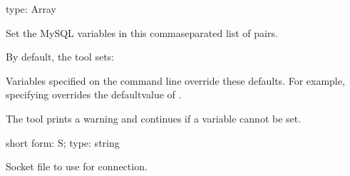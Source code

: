 \documentclass[letterpaper,10pt,english]{sphinxmanual}
\begin{document}
\begin{fulllineitems}
\label{\detokenize{mariadb-config-diff:cmdoption-mariadb-config-diff-set-vars}}
type: Array

Set the MySQL variables in this comma\sphinxhyphen{}separated list of  pairs.

By default, the tool sets:

\begin{sphinxVerbatim}[commandchars=\\\{\}]
\end{sphinxVerbatim}

Variables specified on the command line override these defaults.  For
example, specifying  overrides the defaultvalue of .

The tool prints a warning and continues if a variable cannot be set.

\end{fulllineitems}


\begin{fulllineitems}
\label{\detokenize{mariadb-config-diff:cmdoption-mariadb-config-diff-socket}}
short form: \sphinxhyphen{}S; type: string

Socket file to use for connection.

\end{fulllineitems}

\end{document}
